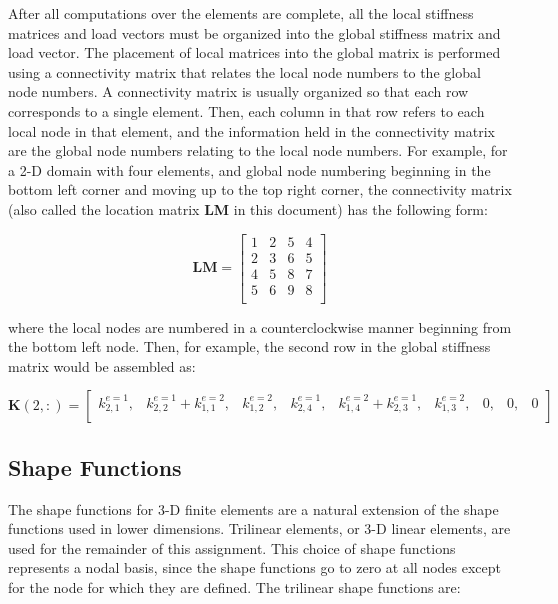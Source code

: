 \documentclass[10pt]{article}
\begin{document}
After all computations over the elements are complete, all the local stiffness matrices and load vectors must be organized into the global stiffness matrix and load vector. The placement of local matrices into the global matrix is performed using a connectivity matrix that relates the local node numbers to the global node numbers. A connectivity matrix is usually organized so that each row corresponds to a single element. Then, each column in that row refers to each local node in that element, and the information held in the connectivity matrix are the global node numbers relating to the local node numbers. For example, for a 2-D domain with four elements, and global node numbering beginning in the bottom left corner and moving up to the top right corner, the connectivity matrix (also called the location matrix \textbf{LM} in this document) has the following form:

\begin{equation}
\textbf{LM}=\begin{bmatrix}
1 & 2 & 5 & 4\\
2 & 3 & 6 & 5\\
4 & 5 & 8 & 7\\
5 & 6 & 9 & 8\\
\end{bmatrix}
\end{equation}

where the local nodes are numbered in a counterclockwise manner beginning from the bottom left node. Then, for example, the second row in the global stiffness matrix would be assembled as:

\begin{equation}
\textbf{K}(2,:)=\begin{bmatrix}
k_{2,1}^{e=1}, & k_{2,2}^{e=1}+k_{1,1}^{e=2}, & k_{1,2}^{e=2}, & k_{2,4}^{e=1}, & k_{1,4}^{e=2}+k_{2,3}^{e=1}, & k_{1,3}^{e=2}, & 0, & 0, & 0\\
\end{bmatrix}
\end{equation}

\subsection{Shape Functions}

The shape functions for 3-D finite elements are a natural extension of the shape functions used in lower dimensions. Trilinear elements, or 3-D linear elements, are used for the remainder of this assignment. This choice of shape functions represents a nodal basis, since the shape functions go to zero at all nodes except for the node for which they are defined. The trilinear shape functions are:
\end{document}
